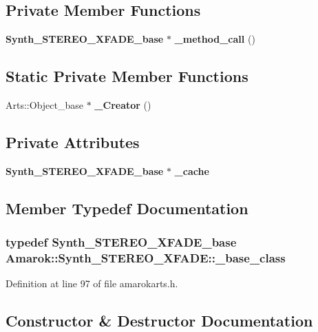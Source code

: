 \subsection*{Private Member Functions}
\begin{CompactItemize}
\item 
{\bf Synth\_\-STEREO\_\-XFADE\_\-base} $\ast$ {\bf \_\-method\_\-call} ()
\end{CompactItemize}
\subsection*{Static Private Member Functions}
\begin{CompactItemize}
\item 
Arts::Object\_\-base $\ast$ {\bf \_\-Creator} ()
\end{CompactItemize}
\subsection*{Private Attributes}
\begin{CompactItemize}
\item 
{\bf Synth\_\-STEREO\_\-XFADE\_\-base} $\ast$ {\bf \_\-cache}
\end{CompactItemize}


\subsection{Member Typedef Documentation}
\subsubsection{\setlength{\rightskip}{0pt plus 5cm}typedef {\bf Synth\_\-STEREO\_\-XFADE\_\-base} {\bf Amarok::Synth\_\-STEREO\_\-XFADE::\_\-base\_\-class}}\label{classAmarok_1_1Synth__STEREO__XFADE_Amarok_1_1Synth__STEREO__XFADEw0}




Definition at line 97 of file amarokarts.h.

\subsection{Constructor \& Destructor Documentation}
